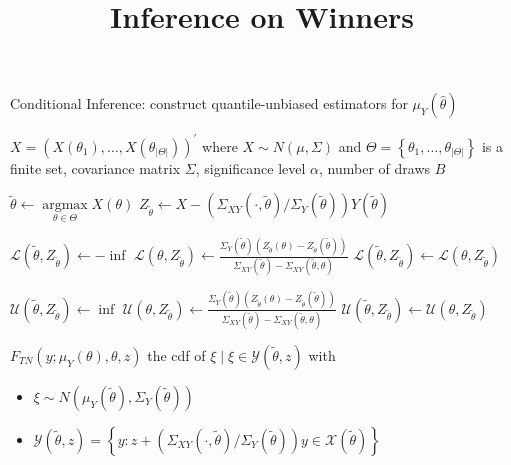 \documentclass[11pt, oneside]{article}
\title{\textbf{Inference on Winners}}
\author{\vspace{-5ex}}
\date{\vspace{-5ex}}
\begin{document}
\begin{algorithm}
\caption{Conditional Inference: construct quantile-unbiased estimators for $\mu_{Y}(\hat{\theta})$}
\begin{algorithmic}
\REQUIRE $X=\left(X\left(\theta_{1}\right), \ldots, X\left(\theta_{|\Theta|}\right)\right)^{\prime}$ where $X \sim N(\mu, \Sigma)$ and $\Theta=\left\{\theta_{1}, \ldots, \theta_{|\Theta|}\right\}$ is a finite set, covariance matrix $\Sigma$, significance level $\alpha$, number of draws $B$

\vspace{0.5cm}
\STATE $\tilde{\theta} \leftarrow \underset{\theta \in \Theta}{\operatorname{argmax}} X(\theta)$
\STATE $Z_{\tilde{\theta}} \leftarrow X-\left(\Sigma_{X Y}(\cdot, \tilde{\theta}) / \Sigma_{Y}(\tilde{\theta})\right) Y(\tilde{\theta})$

\vspace{0.5cm}
\STATE $\mathcal{L}\left(\tilde{\theta}, Z_{\tilde{\theta}}\right) \leftarrow -\inf$
  \STATE $\mathcal{L}\left(\theta, Z_{\tilde{\theta}}\right) \leftarrow \frac{\Sigma_{Y}(\tilde{\theta}) \left(Z_{\tilde{\theta}}(\theta)-Z_{\tilde{\theta}}(\tilde{\theta})\right)}{\Sigma_{X Y}(\tilde{\theta})-\Sigma_{X Y}(\tilde{\theta}, \theta)}$
  \STATE $\mathcal{L}\left(\tilde{\theta}, Z_{\tilde{\theta}}\right) \leftarrow \mathcal{L}\left(\theta, Z_{\tilde{\theta}}\right)$
  \ENDIF
\ENDFOR

\vspace{0.5cm}
\STATE $\mathcal{U}\left(\tilde{\theta}, Z_{\tilde{\theta}}\right) \leftarrow \inf$
  \STATE $\mathcal{U}\left(\theta, Z_{\tilde{\theta}}\right) \leftarrow \frac{\Sigma_{Y} (\tilde{\theta})\left(Z_{\tilde{\theta}}(\theta)-Z_{\tilde{\theta}}(\tilde{\theta})\right)}{\Sigma_{X Y}(\tilde{\theta})-\Sigma_{X Y}(\tilde{\theta}, \theta)}$
  \STATE $\mathcal{U}\left(\tilde{\theta}, Z_{\tilde{\theta}}\right) \leftarrow \mathcal{U}\left(\theta, Z_{\tilde{\theta}}\right)$
  \ENDIF
\ENDFOR

\vspace{0.5cm}
\STATE $F_{T N}\left(y ; \mu_{Y}(\theta), \theta, z\right)$ the cdf of $\xi \mid \xi \in \mathcal{Y}(\tilde{\theta}, z)$ with
\begin{itemize}
\item $\xi \sim N\left(\mu_{Y}(\tilde{\theta}), \Sigma_{Y}(\tilde{\theta})\right)$
\item $\mathcal{Y}(\tilde{\theta}, z)=\left\{y: z+\left(\Sigma_{X Y}(\cdot, \tilde{\theta}) / \Sigma_{Y}(\tilde{\theta})\right) y \in \mathcal{X}(\tilde{\theta})\right\}$
\end{itemize}


\end{algorithmic}
\end{algorithm}
\end{document}
